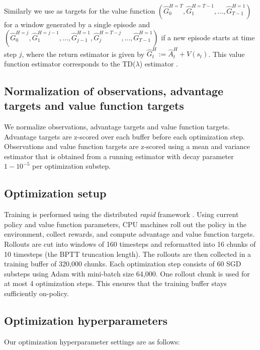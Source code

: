 Similarly we use as targets for the value function $(\hat{G}_0^{H=T}, \hat{G}_1^{H=T-1}, \ldots, \hat{G}_{T-1}^{H=1})$ for a window generated by a single episode and $(\hat{G}_0^{H=j}, \hat{G}_1^{H=j-1}, \ldots, \hat{G}_{j-1}^{H=1}, \hat{G}_j^{H=T-j}, \ldots, \hat{G}_{T-1}^{H=1})$ if a new episode starts at time step $j$, where the return estimator is given by $\hat{G}_t^H := \hat{A}_t^H + V(s_t)$. This value function estimator corresponds to the TD($\lambda$) estimator \citep{sutton2018}.

\subsection{Normalization of observations, advantage targets and value function targets}
We normalize observations, advantage targets and value function targets. Advantage targets are z-scored over each buffer before each optimization step. Observations and value function targets are z-scored using a mean and variance estimator that is obtained from a running estimator with decay parameter $1 - 10^{-5}$ per optimization substep.


\subsection{Optimization setup}
Training is performed using the distributed \textit{rapid} framework \citep{openai2018}. Using current policy and value function parameters, CPU machines roll out the policy in the environment, collect rewards, and compute advantage and value function targets. Rollouts are cut into windows of 160 timesteps and reformatted into 16 chunks of 10 timesteps (the BPTT truncation length). The rollouts are then collected in a training buffer of 320,000 chunks. Each optimization step consists of 60 SGD substeps using Adam with mini-batch size 64,000. One rollout chunk is used for at most 4 optimization steps. This ensures that the training buffer stays sufficiently on-policy.

\subsection{Optimization hyperparameters}\label{appendix:hyperparam}

Our optimization hyperparameter settings are as follows:

